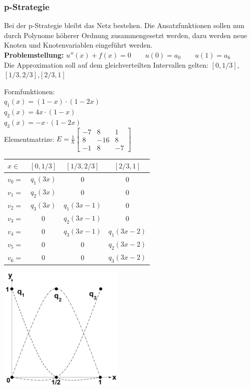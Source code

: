 \subsubsection{p-Strategie}
Bei der p-Strategie bleibt das Netz bestehen. Die Ansatzfunktionen sollen nun durch Polynome höherer Ordnung zusammengesetzt werden, dazu werden neue Knoten und Knotenvariablen eingeführt werden.\\

\textbf{Problemstellung:} $u''(x)+f(x)=0\qquad u(0)=a_0\qquad u(1)=a_6$\\

Die Approximation soll auf dem gleichverteilten Intervallen gelten: $[0,1/3]$,\quad $[1/3,2/3]$,\quad $[2/3,1]$\\

\begin{minipage}{4cm}
	Formfunktionen:\\

	$q_1(x)=(1-x)\cdot(1-2x)$\\
	$q_2(x)=4x\cdot(1-x)$\\
	$q_3(x)=-x\cdot(1-2x)$\\
	
	Elementmatrize: $\boxed{E=\frac{1}{h}
	\begin{bmatrix}
		-7& 8 & 1\\
		8& -16& 8\\
		-1& 8& -7	
	\end{bmatrix}}$\\
\end{minipage}
\hfill
\begin{minipage}{8cm}
	\begin{tabular}{lc|c|c}
		$x\in$&$[0,1/3]$&$[1/3,2/3]$&$[2/3,1]$\\
		\hline
		$v_0=$&$q_1(3x)$&$0$&$0$\\
		$v_1=$&$q_2(3x)$&$0$&$0$\\
		$v_2=$&$q_3(3x)$&$q_1(3x-1)$&$0$\\
		$v_3=$&$0$&$q_2(3x-1)$&$0$\\
		$v_4=$&$0$&$q_3(3x-1)$&$q_1(3x-2)$\\
		$v_5=$&$0$&$0$&$q_2(3x-2)$\\
		$v_6=$&$0$&$0$&$q_3(3x-2)$\\
	\end{tabular}
\end{minipage}
\hfill
\begin{minipage}{6cm}
\includegraphics[width=6cm]{Content/Numerik/FEM2Ord}
\end{minipage}\\

